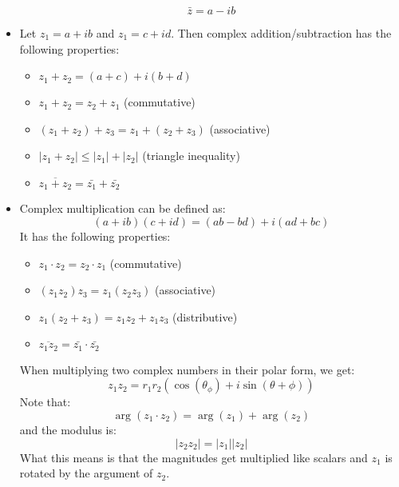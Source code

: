 \documentclass{article}
\begin{document}
\begin{itemize}
    \begin{equation}
        \bar{z} = a - ib
        \label{eq:}
    \end{equation}
    \item Let $z_1=a+ib$ and $z_1=c+id$. Then complex addition/subtraction has the following properties:
    \begin{itemize}
        \item $z_1+z_2 = (a+c) + i(b+d)$
        \item $z_1+z_2 = z_2+z_1$ (commutative)
        \item $(z_1+z_2)+z_3=z_1+(z_2+z_3)$ (associative)
        \item $|z_1+z_2| \le |z_1| + |z_2|$ (triangle inequality)
        \item $\overline{z_1+z_2} = \bar{z_1}+\bar{z_2}$
    \end{itemize}
    \item Complex multiplication can be defined as:
    \begin{equation}
        (a+ib)(c+id) = (ab-bd)+i(ad+bc)
        \label{eq:}
    \end{equation}
    It has the following properties:
    \begin{itemize}
        \item $z_1 \cdot z_2 = z_2 \cdot z_1$ (commutative)
        \item $(z_1 z_2) z_3 = z_1(z_2z_3)$ (associative)
        \item $z_1(z_2+z_3) = z_1z_2+z_1z_3$ (distributive)
        \item $\overline{z_1z_2} = \bar{z_1} \cdot \bar{z_2}$
    \end{itemize}
    \begin{idea}
        When multiplying two complex numbers in their polar form, we get:
        \begin{equation}
            z_1z_2 = r_1r_2\left(\cos(\theta_\phi)+i\sin(\theta+\phi)\right)
            \label{eq:}
        \end{equation}
        Note that:
        \begin{equation}
            \arg(z_1 \cdot z_2) = \arg(z_1) + \arg(z_2)
            \label{eq:}
        \end{equation}
        and the modulus is:
        \begin{equation}
            |z_2z_2| = |z_1||z_2|
            \label{eq:}
        \end{equation}
        What this means is that the magnitudes get multiplied like scalars and $z_1$ is rotated by the argument of $z_2$.

\end{idea}
\end{itemize}
\end{document}
